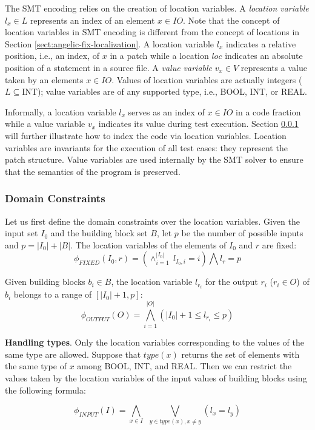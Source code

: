 The SMT encoding relies on the creation of location variables. A {\em location variable} $l_x \in L$ represents an index of an element $x\in IO$. Note that the concept of location variables in SMT encoding is different from the concept of locations in Section \ref{sect:angelic-fix-localization}. A location variable $l_x$ indicates a relative position, i.e., an index, of $x$ in a patch while a location $loc$ indicates an absolute position of a statement in a source file. 
A {\em value variable} $v_x \in V$ represents a value taken by an elements $x \in IO$. Values of location variables are actually integers ($L \subseteq \mbox{INT}$);
value variables are of any supported type, i.e., BOOL, INT, or REAL. 

Informally, a location variable $l_x$ serves as an index of $x \in IO$ in a code fraction while a value variable $v_x$ indicates its value during test execution. Section \ref{subsubsect:domain} will further illustrate how to index the code via location variables. 
Location variables are invariants for the execution of all test cases: they represent the patch structure.
Value variables are used internally by the SMT solver to ensure that the semantics of the program is preserved.

\subsubsection{Domain Constraints}
\label{subsubsect:domain}

Let us first define the domain constraints over the location variables. Given the input set $I_0$ and the building block set $B$, let $p$ be the number of possible inputs and $p=|I_0|+|B|$. 
The location variables of the elements of $I_0$ and $r$ are fixed:
$$\phi_{FIXED}(I_0,r) = ( \land_{i=1}^{|I_0|} \ l_{I_0,i} = i ) \bigwedge l_r = p$$

Given building blocks $b_i \in B$, the location variable $l_{r_i}$ for the output $r_i$ ($r_i \in O$) of $b_i$ belongs to a range of $[|I_0|+1, p]$:
$$\phi_{OUTPUT}(O) = \bigwedge_{i=1}^{|O|} ( |I_0|+1 \leq l_{r_i} \leq p)$$

\textbf{Handling types}. Only the location variables corresponding to the values of the same type are allowed.
Suppose that $type(x)$ returns the set of elements with the same type of $x$ among BOOL, INT, and REAL. Then we can restrict the values taken by the location variables of the input values of building blocks using the following formula:

$$\phi_{INPUT}(I) = \bigwedge_{x \in I} \ \ \bigvee_{y \in type(x), x \neq y} (l_x = l_y)$$

